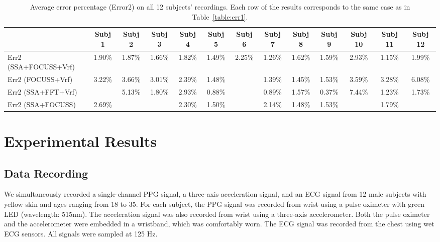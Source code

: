 \documentclass[10pt,twocolumn]{IEEEtran}
\begin{document}
\begin{table*}[t]
\renewcommand{\arraystretch}{1.2}
\caption{Average error percentage (Error2) on all 12 subjects' recordings. Each row of the results corresponds to the same case as in Table~\ref{table:err1}.}
\label{table:err2}
\centering
\begin{tabular}{l|c|c|c|c|c|c|c|c|c|c|c|c}
\toprule
       &  Subj 1      & Subj 2   &  Subj 3   &  Subj 4   &Subj 5  &Subj  6  &Subj 7  &Subj  8  &Subj 9  &Subj 10 &Subj 11 & Subj 12\\
\midrule
Err2  (SSA+FOCUSS+Vrf)       &  1.90\%   &  1.87\%   &  1.66\%  & 1.82\%    &  1.49\%   &  2.25\% & 1.26\% &  1.62\% &  1.59\% &  2.93\% & 1.15\% & 1.99\%\\
\hline
Err2  (FOCUSS+Vrf)  &  3.22\%    & 3.66\%     & 3.01\%    & 2.39\%     &  1.48\%    & {\color{red}}   & 1.39\%  & 1.45\%   & 1.53\%   & 3.59\%   & 3.28\%   &  6.08\% \\
\hline
Err2  (SSA+FFT+Vrf)       &  {\color{red}}   &  5.13\%   &  1.80\%  & 2.93\%    &  0.88\%   &  {\color{red}} & 0.89\% &  1.57\% &  0.37\% &  7.44\% & 1.23\% & 1.73\%\\
\hline
Err2  (SSA+FOCUSS)       &  2.69\%   &  {\color{red}}   &  {\color{red}}  & 2.30\%    &  1.50\%   &  {\color{red}} & 2.14\% &  1.48\% &  1.53\% &  {\color{red}} & 1.79\% & {\color{red}} \\
\bottomrule
\end{tabular}
\end{table*}









\section{Experimental Results}
\label{sec:experiments}

\subsection{Data Recording}

We simultaneously recorded a single-channel PPG signal, a three-axis acceleration signal, and an ECG signal from 12 male subjects with yellow skin and ages ranging from 18 to 35.
For each subject, the PPG signal was recorded from wrist using a  pulse oximeter   with green LED (wavelength: 515nm). The acceleration signal was also recorded from  wrist using a three-axis accelerometer. Both the pulse oximeter and the accelerometer were embedded in a wristband, which was comfortably worn. The ECG signal was recorded from the chest using wet ECG sensors. All signals were sampled at 125 Hz.
\end{document}
